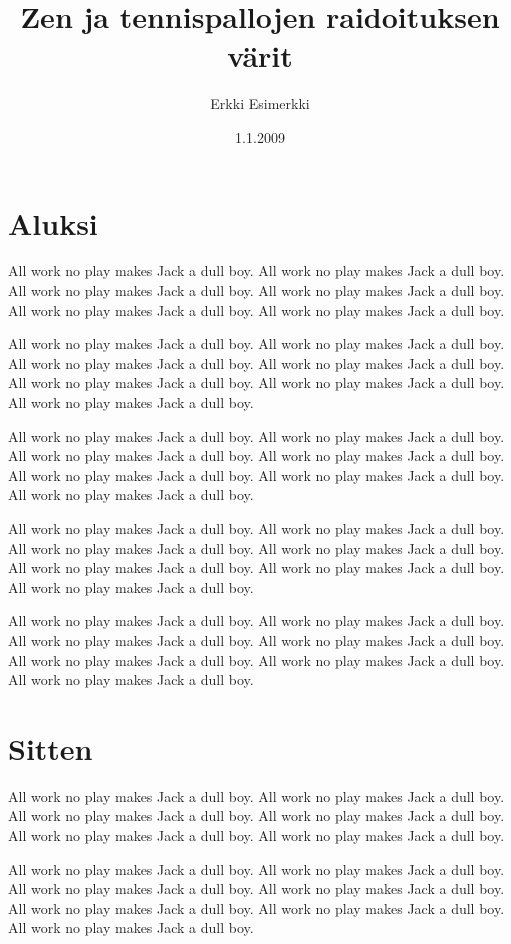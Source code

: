 \documentclass{sfs-2487-2000}
\author{Erkki Esimerkki}
\date{1.1.2009}
\title{Zen ja tennispallojen raidoituksen värit}
\begin{document}
\maketitle

\section{Aluksi}

\align All work no play makes Jack a dull boy. All work no play makes Jack a dull boy. All work no play makes Jack a dull boy. All work no play makes Jack a dull boy. All work no play makes Jack a dull boy. All work no play makes Jack a dull boy.

All work no play makes Jack a dull boy. All work no play makes Jack a dull boy. All work no play makes Jack a dull boy. All work no play makes Jack a dull boy. All work no play makes Jack a dull boy. All work no play makes Jack a dull boy. All work no play makes Jack a dull boy.

All work no play makes Jack a dull boy. All work no play makes Jack a dull boy. All work no play makes Jack a dull boy. All work no play makes Jack a dull boy. All work no play makes Jack a dull boy. All work no play makes Jack a dull boy. All work no play makes Jack a dull boy.

All work no play makes Jack a dull boy. All work no play makes Jack a dull boy. All work no play makes Jack a dull boy. All work no play makes Jack a dull boy. All work no play makes Jack a dull boy. All work no play makes Jack a dull boy. All work no play makes Jack a dull boy.

All work no play makes Jack a dull boy. All work no play makes Jack a dull boy. All work no play makes Jack a dull boy. All work no play makes Jack a dull boy. All work no play makes Jack a dull boy. All work no play makes Jack a dull boy. All work no play makes Jack a dull boy.

\section{Sitten}

\align All work no play makes Jack a dull boy. All work no play makes Jack a dull boy. All work no play makes Jack a dull boy. All work no play makes Jack a dull boy. All work no play makes Jack a dull boy. All work no play makes Jack a dull boy.

All work no play makes Jack a dull boy. All work no play makes Jack a dull boy. All work no play makes Jack a dull boy. All work no play makes Jack a dull boy. All work no play makes Jack a dull boy. All work no play makes Jack a dull boy. All work no play makes Jack a dull boy.
\end{document}
